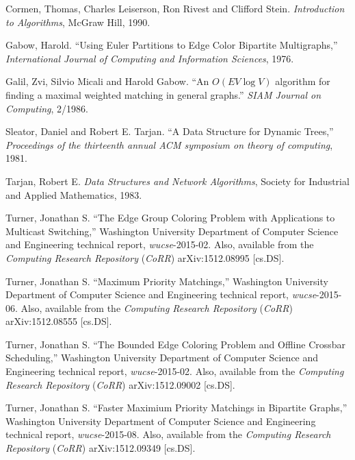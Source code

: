 \documentclass[11pt]{article}
\begin{document}
\begin{thebibliography}{99}

Cormen, Thomas, Charles Leiserson, Ron Rivest and Clifford Stein.
{\sl Introduction to Algorithms}, McGraw Hill, 1990.

Gabow, Harold. ``Using Euler Partitions to Edge Color Bipartite Multigraphs,''
{\sl International Journal of Computing and Information Sciences}, 1976.

Galil, Zvi, Silvio Micali and Harold Gabow.
``An $O(EV \log V)$ algorithm for finding a maximal weighted matching in general graphs.''
{\sl SIAM Journal on Computing}, 2/1986.

Sleator, Daniel and Robert E. Tarjan. ``A Data Structure for Dynamic Trees,'' 
{\sl Proceedings of the thirteenth annual ACM symposium on theory of computing}, 1981.

Tarjan, Robert E.
{\sl Data Structures and Network Algorithms},
Society for Industrial and Applied Mathematics, 1983.

Turner, Jonathan S.
``The Edge Group Coloring Problem with Applications to Multicast Switching,''
Washington University Department of Computer Science and Engineering technical report,
{\sl wucse}-2015-02. Also, available from the {\sl Computing Research Repository} ({\sl CoRR})
arXiv:1512.08995 [cs.DS].

Turner, Jonathan S.
``Maximum Priority Matchings,''
Washington University Department of Computer Science and Engineering technical report,
{\sl wucse}-2015-06. Also, available from the {\sl Computing Research Repository} ({\sl CoRR})
arXiv:1512.08555 [cs.DS].

Turner, Jonathan S.
``The Bounded Edge Coloring Problem and Offline Crossbar Scheduling,''
Washington University Department of Computer Science and Engineering technical report,
{\sl wucse}-2015-02. Also, available from the {\sl Computing Research Repository} ({\sl CoRR})
arXiv:1512.09002 [cs.DS].

Turner, Jonathan S.
``Faster Maximium Priority Matchings in Bipartite Graphs,''
Washington University Department of Computer Science and Engineering technical report,
{\sl wucse}-2015-08. Also, available from the {\sl Computing Research Repository} ({\sl CoRR})
arXiv:1512.09349 [cs.DS].
\end{thebibliography}
 
\end{document}
